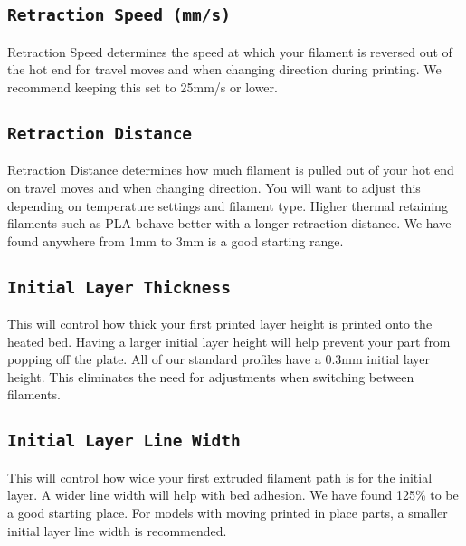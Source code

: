 \subsection{\texttt{Retraction Speed (mm/s)}}
Retraction Speed determines the speed at which your filament is reversed out of the hot end for travel moves and when changing direction during printing. We recommend keeping this set to 25mm/s or lower.

\subsection{\texttt{Retraction Distance}}
Retraction Distance determines how much filament is pulled out of your hot end on travel moves and when changing direction. You will want to adjust this depending on temperature settings and filament type. Higher thermal retaining filaments such as PLA behave better with a longer retraction distance. We have found anywhere from 1mm to 3mm is a good starting range.

\subsection{\texttt{Initial Layer Thickness}}
This will control how thick your first printed layer height is printed onto the heated bed. Having a larger initial layer height will help prevent your part from popping off the plate. All of our standard profiles have a 0.3mm initial layer height. This eliminates the need for adjustments when switching between filaments.  %
\subsection{\texttt{Initial Layer Line Width}}
This will control how wide your first extruded filament path is for the initial layer. A wider line width will help with bed adhesion. We have found 125\% to be a good starting place. For models with moving printed in place parts, a smaller initial layer line width is recommended. %

